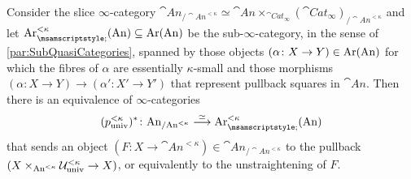\begin{lem}\label{lem:StraighteningFunctorial}
	Consider the slice $\infty$-category $\cat{An}_{/\cat{An}^{<\kappa}}\simeq \cat{An}\times_{\cat{Cat}_\infty}(\cat{Cat}_\infty)_{/\cat{An}^{<\kappa}}$ and let $\Ar_{\pullbacksign \vphantom{^t} }^{<\kappa}(\cat{An})\subseteq \Ar(\cat{An})$ be the  sub-$\infty$-category, in the sense of \cref{par:SubQuasiCategories}, spanned by those objects $(\alpha\colon X\rightarrow Y)\in \operatorname{Ar}(\mathrm{An})$ for which the fibres of $\alpha$ are essentially $\kappa$-small and those morphisms $(\alpha\colon X\rightarrow Y)\rightarrow (\alpha'\colon X'\rightarrow Y')$ that represent pullback squares in $\cat{An}$. Then there is an equivalence of $\infty$-categories
	\begin{equation*}
		(p_\mathrm{univ}^{<\kappa})^*\colon \cat{An}_{/\cat{An}^{<\kappa}}\overset{\simeq}{\longrightarrow} \Ar_{\pullbacksign\vphantom{^t}}^{<\kappa}(\cat{An})
	\end{equation*}
	that sends an object $(F\colon X\rightarrow \cat{An}^{<\kappa})\in\cat{An}_{/\cat{An}^{<\kappa}}$ to the pullback $(X\times_{\mathrm{An}^{<\kappa}}\mathcal{U}_\mathrm{univ}^{<\kappa}\rightarrow X)$, or equivalently  to the unstraightening of $F$.
\end{lem}
